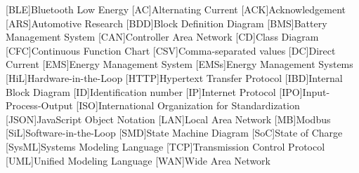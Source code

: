 % 
\begin{acronym}[STATCOM]    %
%
[BLE]{Bluetooth Low Energy}
%
[AC]{Alternating Current}
%
[ACK]{Acknowledgement}
%
[ARS]{Automotive Research}
%
[BDD]{Block Definition Diagram}
%
[BMS]{Battery Management System}
%
[CAN]{Controller Area Network}
%
[CD]{Class Diagram}
%
[CFC]{Continuous Function Chart}
%
[CSV]{Comma-separated values}
%
[DC]{Direct Current}
%
[EMS]{Energy Management System}
[EMSs]{Energy Management Systems}
%
[HiL]{Hardware-in-the-Loop}
%
[HTTP]{Hypertext Transfer Protocol}
%
[IBD]{Internal Block Diagram}
%
[ID]{Identification number}
%
[IP]{Internet Protocol}
%
[IPO]{Input-Process-Output}
%
[ISO]{International Organization for Standardization}
%
[JSON]{JavaScript Object Notation}
%
[LAN]{Local Area Network}
%
[MB]{Modbus}
%
[SiL]{Software-in-the-Loop}
%
[SMD]{State Machine Diagram}
%
[SoC]{State of Charge}
%
[SysML]{Systems Modeling Language}
%
[TCP]{Transmission Control Protocol}
%
[UML]{Unified Modeling Language}
%
[WAN]{Wide Area Network}
%
\end{acronym}
%